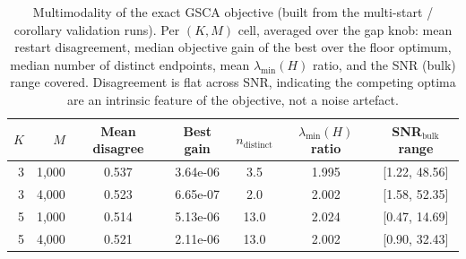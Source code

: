 \begin{table}[t]
\centering
\caption{Multimodality of the exact GSCA objective (built from the multi-start / corollary validation runs). Per $(K,M)$ cell, averaged over the gap knob: mean restart disagreement, median objective gain of the best over the floor optimum, median number of distinct endpoints, mean $\lambda_{\min}(H)$ ratio, and the SNR (bulk) range covered. Disagreement is flat across SNR, indicating the competing optima are an intrinsic feature of the objective, not a noise artefact.}
\label{tab:block5}
\begin{tabular}{rrccccc}
\toprule
$K$ & $M$ & Mean disagree & Best gain & $n_{\text{distinct}}$ & $\lambda_{\min}(H)$ ratio & SNR$_{\text{bulk}}$ range \\
\midrule
3 & 1,000 & 0.537 & 3.64e-06 & 3.5 & 1.995 & [1.22, 48.56] \\
3 & 4,000 & 0.523 & 6.65e-07 & 2.0 & 2.002 & [1.58, 52.35] \\
5 & 1,000 & 0.514 & 5.13e-06 & 13.0 & 2.024 & [0.47, 14.69] \\
5 & 4,000 & 0.521 & 2.11e-06 & 13.0 & 2.002 & [0.90, 32.43] \\
\bottomrule
\end{tabular}
\end{table}
